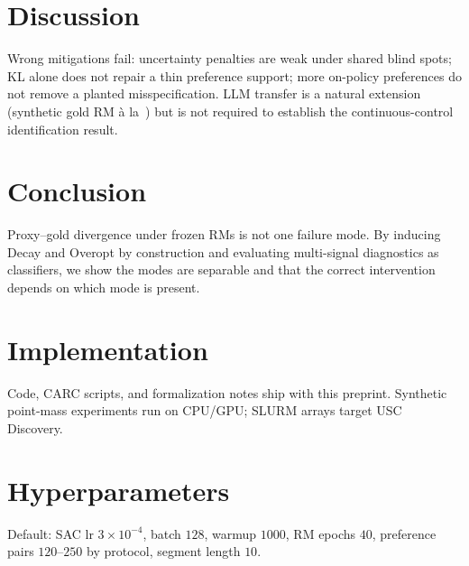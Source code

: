 \documentclass{article}
\begin{document}
\section{Discussion}
Wrong mitigations fail: uncertainty penalties are weak under shared blind spots; KL alone does not repair a thin preference support; more on-policy preferences do not remove a planted misspecification.
LLM transfer is a natural extension (synthetic gold RM \`a la~\cite{gao2023scaling}) but is not required to establish the continuous-control identification result.

\section{Conclusion}
Proxy--gold divergence under frozen RMs is not one failure mode.
By inducing Decay and Overopt by construction and evaluating multi-signal diagnostics as classifiers, we show the modes are separable and that the correct intervention depends on which mode is present.

\clearpage
\appendix
\section{Implementation}
Code, CARC scripts, and formalization notes ship with this preprint.
Synthetic point-mass experiments run on CPU/GPU; SLURM arrays target USC Discovery.

\section{Hyperparameters}
Default: SAC lr $3{\times}10^{-4}$, batch $128$, warmup $1000$, RM epochs $40$, preference pairs $120$--$250$ by protocol, segment length $10$.



\end{document}
